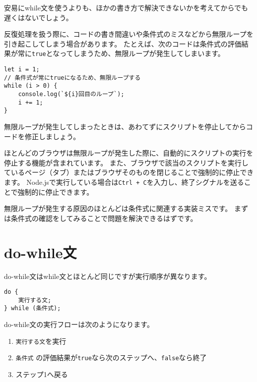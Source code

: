 安易にwhile文を使うよりも、ほかの書き方で解決できないかを考えてからでも遅くはないでしょう。

\begin{tcolorbox}[title=無限ループ]\label{inifinite-loop}

反復処理を扱う際に、コードの書き間違いや条件式のミスなどから無限ループを引き起こしてしまう場合があります。
たとえば、次のコードは条件式の評価結果が常に\texttt{true}となってしまうため、無限ループが発生してしまいます。

\begin{lstlisting}
let i = 1;
// 条件式が常にtrueになるため、無限ループする
while (i > 0) {
    console.log(`${i}回目のループ`);
    i += 1;
}
\end{lstlisting}

無限ループが発生してしまったときは、あわてずにスクリプトを停止してからコードを修正しましょう。

ほとんどのブラウザは無限ループが発生した際に、自動的にスクリプトの実行を停止する機能が含まれています。
また、ブラウザで該当のスクリプトを実行しているページ（タブ）またはブラウザそのものを閉じることで強制的に停止できます。
Node.jsで実行している場合は\texttt{Ctrl + C}を入力し、終了シグナルを送ることで強制的に停止できます。

無限ループが発生する原因のほとんどは条件式に関連する実装ミスです。
まずは条件式の確認をしてみることで問題を解決できるはずです。
\end{tcolorbox}

\hypertarget{do-while-statement}{%
\section{do-while文}\label{do-while-statement}}

do-while文はwhile文とほとんど同じですが実行順序が異なります。

\begin{lstlisting}
do {
    実行する文;
} while (条件式);
\end{lstlisting}

do-while文の実行フローは次のようになります。

\begin{enumerate}
\def\labelenumi{\arabic{enumi}.}
\item
  \texttt{実行する文}を実行
\item
  \texttt{条件式}
  の評価結果が\texttt{true}なら次のステップへ、\texttt{false}なら終了
\item
  ステップ1へ戻る
\end{enumerate}

